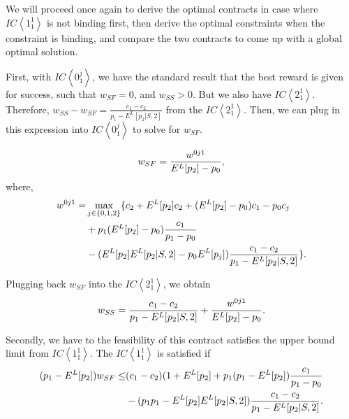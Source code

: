 \documentclass[11pt]{article} %
\theoremstyle{exampstyle}
\newcommand{\eq}[1]{\begin{align}#1\end{align}}
\newcommand{\la}{ \left < }
\newcommand{\ra}{ \right > }
\begin{document}
We will proceed once again to derive the optimal contracts in case where $IC\la1^1_1\ra$ is not binding first, then derive the optimal constraints when the constraint is binding, and compare the two contracts to come up with a global optimal solution. 

First, with $IC \la 0^j_1 \ra$, we have the standard result that the best reward is given for success, such that $w_{SF}=0$, and $w_{SS}>0$. But we also have $IC \la 2^1_1 \ra$. Therefore, $w_{SS} - w_{SF} = \frac{c_1 - c_2}{p_1 - E^L[p_2 | S, 2]}$ from the $IC \la 2^1_1 \ra$. Then, we can plug in this expression into $IC \la 0^j_1 \ra$ to solve for $w_{SF}$. 

\eq{
w_{SF} = \frac{w^{0j1}}{E^L[p_2] - p_0},  \notag 
}
where,
\eq{
w^{0j1} =& \max_{j \in \{0,1,2 \}} \{ c_2 + E^L[p_2] c_2 + ( E^L[p_2] - p_0 ) c_1 - p_0 c_j \notag \\
& + p_1 (E^L[p_2] - p_0) \frac{c_1}{p_1 - p_0} \notag \\
& - (E^L[p_2] E^L[p_2 | S,2] - p_0 E^L[p_j]) \frac{c_1 - c_2}{p_1 - E^L[p_2 | S,2]}  \}	\notag .
}

Plugging back $w_{SF}$ into the $IC \la 2^1_1 \ra$, we obtain
\eq{
w_{SS} =\frac{c_1 - c_2}{p_1 - E^L[p_2 | S, 2]}+ \frac{w^{0j1}}{E^L[p_2] - p_0}.  \notag 
}

Secondly, we have to the feasibility of this contract satisfies the upper bound limit from $IC \la1^1_1 \ra$. The $IC \la 1^1_1 \ra$ is satisfied if
\eq{
(p_1 - E^L[p_2]) w_{SF} \le & (c_1-c_2) (1+E^L[p_2] + p_1 (p_1 - E^L[p_2]) \frac{ c_1} {p_1 - p_0} \notag \\
& - (p_1 p_1 - E^L[p_2] E^L[p_2 |S,2]) \frac{c_1 - c_2}{ p_1 - E^L[p_2 |S, 2]}. \notag 
}
\end{document}
